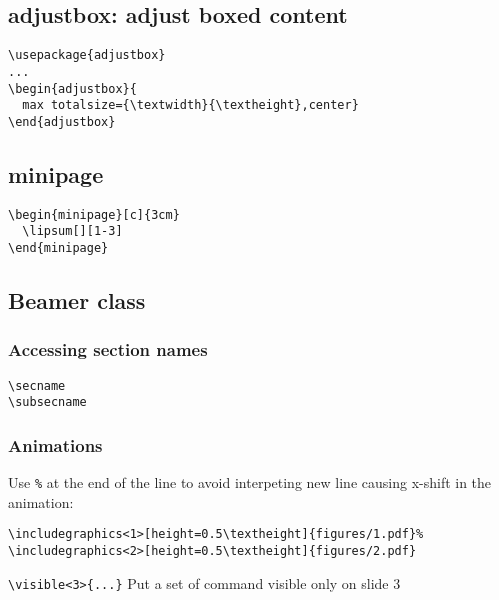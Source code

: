 \subsection{adjustbox: adjust boxed content}
\begin{verbatim}
\usepackage{adjustbox}
...
\begin{adjustbox}{
  max totalsize={\textwidth}{\textheight},center}
\end{adjustbox}
\end{verbatim}

\subsection{minipage}
\begin{minipage}[c]{3cm}
  \lipsum[][1-3]
\end{minipage}
\begin{minipage}[c]{3cm}
  \begin{verbatim}
\begin{minipage}[c]{3cm}
  \lipsum[][1-3]
\end{minipage}
  \end{verbatim}
\end{minipage}

\subsection{Beamer class}

\subsubsection{Accessing section names}
\verb |\secname|\\
\verb |\subsecname|\\

\subsubsection{Animations}
Use \verb|%| at the end of the line to avoid interpeting new line causing x-shift in the animation:
\begin{verbatim}
\includegraphics<1>[height=0.5\textheight]{figures/1.pdf}%
\includegraphics<2>[height=0.5\textheight]{figures/2.pdf}
\end{verbatim}
\verb|\visible<3>{...}| Put a set of command visible only on slide 3

